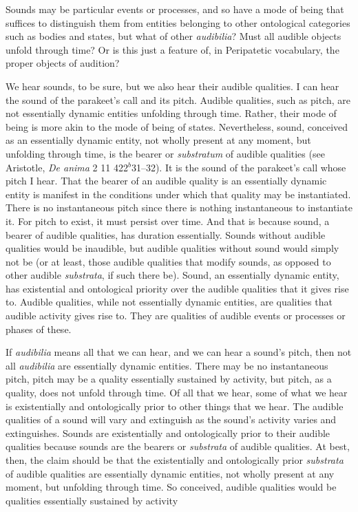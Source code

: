 Sounds may be particular events or processes, and so have a mode of being that suffices to distinguish them from entities belonging to other ontological categories such as bodies and states, but what of other \emph{audibilia}? Must all audible objects unfold through time? Or is this just a feature of, in Peripatetic vocabulary, the proper objects of audition? 

We hear sounds, to be sure, but we also hear their audible qualities. I can hear the sound of the parakeet's call and its pitch. Audible qualities, such as pitch, are not essentially dynamic entities unfolding through time. Rather, their mode of being is more akin to the mode of being of states. Nevertheless, sound, conceived as an essentially dynamic entity, not wholly present at any moment, but unfolding through time, is the bearer or \emph{substratum} of audible qualities (see Aristotle, \emph{De anima} 2 11 422\( ^{b} \)31–32). It is the sound of the parakeet's call whose pitch I hear. That the bearer of an audible quality is an essentially dynamic entity is manifest in the conditions under which that quality may be instantiated. There is no instantaneous pitch since there is nothing instantaneous to instantiate it. For pitch to exist, it must persist over time. And that is because sound, a bearer of audible qualities, has duration essentially. Sounds without audible qualities would be inaudible, but audible qualities without sound would simply not be (or at least, those audible qualities that modify sounds, as opposed to other audible \emph{substrata}, if such there be). Sound, an essentially dynamic entity, has existential and ontological priority over the audible qualities that it gives rise to. Audible qualities, while not essentially dynamic entities, are qualities that audible activity gives rise to. They are qualities of audible events or processes or phases of these.

If \emph{audibilia} means all that we can hear, and we can hear a sound's pitch, then not all \emph{audibilia} are essentially dynamic entities. There may be no instantaneous pitch, pitch may be a quality essentially sustained by activity, but pitch, as a quality, does not unfold through time. Of all that we hear, some of what we hear is existentially and ontologically prior to other things that we hear. The audible qualities of a sound will vary and extinguish as the sound's activity varies and extinguishes. Sounds are existentially and ontologically prior to their audible qualities because sounds are the bearers or \emph{substrata} of audible qualities. At best, then, the claim should be that the existentially and ontologically prior \emph{substrata} of audible qualities are essentially dynamic entities, not wholly present at any moment, but unfolding through time. So conceived, audible qualities would be qualities essentially sustained by activity

